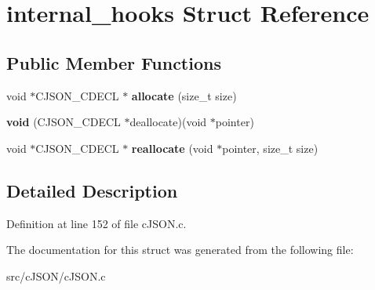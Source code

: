 \hypertarget{structinternal__hooks}{}\section{internal\+\_\+hooks Struct Reference}
\label{structinternal__hooks}
\subsection*{Public Member Functions}
\begin{DoxyCompactItemize}
\item 
\mbox{\label{structinternal__hooks_a872a0c28217b451331d24b8e0484b293}} 
void $\ast$C\+J\+S\+O\+N\+\_\+\+C\+D\+E\+CL $\ast$ {\bfseries allocate} (size\+\_\+t size)
\item 
\mbox{\label{structinternal__hooks_a5cc2dd5383da5f20b19e0f27fa59e123}} 
{\bfseries void} (C\+J\+S\+O\+N\+\_\+\+C\+D\+E\+CL $\ast$deallocate)(void $\ast$pointer)
\item 
\mbox{\label{structinternal__hooks_a5dd48d5c2f2b1cf4f6eec5df6205e15c}} 
void $\ast$C\+J\+S\+O\+N\+\_\+\+C\+D\+E\+CL $\ast$ {\bfseries reallocate} (void $\ast$pointer, size\+\_\+t size)
\end{DoxyCompactItemize}


\subsection{Detailed Description}


Definition at line 152 of file c\+J\+S\+O\+N.\+c.



The documentation for this struct was generated from the following file\+:\begin{DoxyCompactItemize}
\item 
src/c\+J\+S\+O\+N/c\+J\+S\+O\+N.\+c\end{DoxyCompactItemize}
